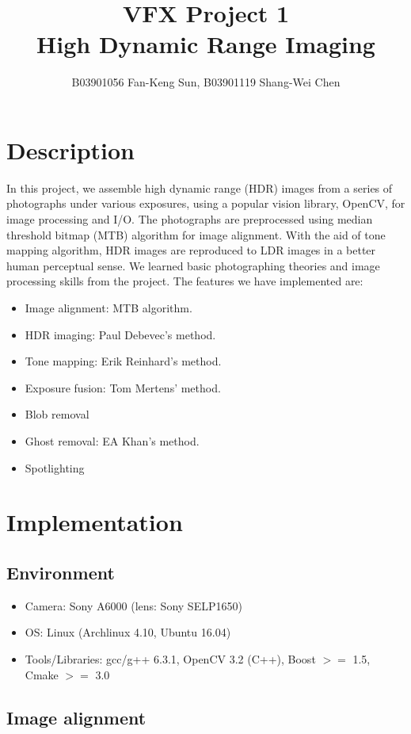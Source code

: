 \documentclass[11pt]{article}
\title{\bf{VFX Project 1\\\large{High Dynamic Range Imaging}}\vspace{-10pt}}
\author{B03901056 Fan-Keng Sun, B03901119 Shang-Wei Chen}
\date{}
\begin{document}
\maketitle
\section{Description}
In this project, we assemble high dynamic range (HDR) images from a series of photographs under various exposures, using a popular vision library, OpenCV, for image processing and I/O. The photographs are preprocessed using median threshold bitmap (MTB) algorithm for image alignment. With the aid of tone mapping algorithm, HDR images are reproduced to LDR images in a better human perceptual sense. We learned basic photographing theories and image processing skills from the project. The features we have implemented are:
\vspace{-8pt}
\begin{itemize}
  \itemsep=-2pt
  \item Image alignment: MTB algorithm.
  \item HDR imaging: Paul Debevec's method.
  \item Tone mapping: Erik Reinhard's method.
  \item Exposure fusion: Tom Mertens' method.
  \item Blob removal
  \item Ghost removal: EA Khan's method.
  \item Spotlighting
\end{itemize}
\vspace{-8pt}

\section{Implementation}
\subsection{Environment}
\begin{itemize}
  \itemsep=-2pt
  \item Camera: Sony A6000 (lens: Sony SELP1650)
  \item OS: Linux (Archlinux 4.10, Ubuntu 16.04)
  \item Tools/Libraries: gcc/g++ 6.3.1, OpenCV 3.2 (C++), Boost $>=$ 1.5, Cmake $>=$ 3.0
\end{itemize}

\subsection{Image alignment}

\end{document}
